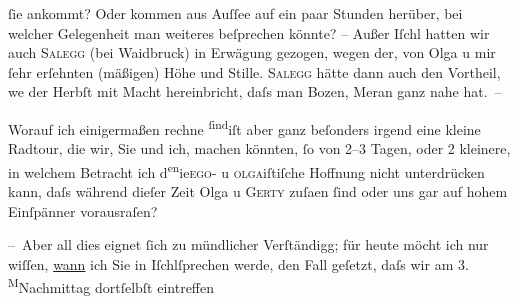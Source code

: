                ſie ankommt? Oder kommen aus Auſſee auf ein paar
               Stunden herüber, bei welcher Gelegenheit man weiteres beſprechen könnte? – Außer Iſchl hatten wir auch \textsc{Salegg} (bei Waidbruck) in {\pb}Erwägung gezogen, wegen der, von Olga u mir ſehr erſehnten (mäßigen) Höhe und Stille. \textsc{Salegg} hätte dann auch den Vortheil, we{\geminationn} der
                  Herbſt mit Macht hereinbricht, daſs man Bozen, Meran ganz nahe
               hat. –\pend
           
\pstart
           Worauf ich einigermaßen rechne \substVorne{}\textsuperscript{ſind}\substDazwischen{}iſt\substHinten{} aber ganz beſonders irgend eine kleine Radtour, die wir, Sie und ich, machen
               könnten, ſo von 2–3 Tagen, oder 2 kleinere, {\pb}in welchem
               Betracht ich d\substVorne{}\textsuperscript{en}\substDazwischen{}ie\substHinten{}{ }\textsc{ego}- u \textsc{olga}iſtiſche Hoffnung nicht unterdrücken kann, daſs während dieſer Zeit Olga u \textsc{Gerty} zuſa{\geminationm}en ſind oder uns gar auf hohem Einſpänner
               vorausraſen?\pend
           
\pstart
           – Aber all dies eignet ſich zu mündlicher Verſtändigg; für heute möcht ich nur
               wiſſen, \uline{wann} ich Sie in Iſchlſprechen werde, den Fall geſetzt, daſs wir am
                  3.{ }\substVorne{}\textsuperscript{M}\substDazwischen{}Na\substHinten{}chmittag dortſelbſt eintreffen\pend
           
